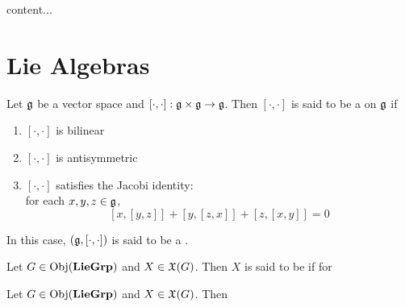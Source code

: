 \documentclass{book}
\begin{document}
\begin{defn}
	content...
\end{defn}






































\section{Lie Algebras}

\begin{defn}
	Let $\mathfrak{g}$ be a vector space and $[\cdot, \cdot]: \mathfrak{g} \times \mathfrak{g} \rightarrow \mathfrak{g}$. 
	Then $[\cdot, \cdot]$ is said to be a  on $\mathfrak{g}$ if  
	\begin{enumerate}
		\item $[\cdot, \cdot]$ is bilinear
		\item $[\cdot, \cdot]$ is antisymmetric
		\item $[\cdot, \cdot]$ satisfies the Jacobi identity: \\
		for each $x, y, z \in \mathfrak{g}$, 
		$$[x, [y,z]] + [y, [z,x]] + [z, [x,y]] = 0$$
	\end{enumerate}
	In this case, $(\mathfrak{g}, [\cdot, \cdot])$ is said to be a .
\end{defn}

\begin{defn}
	Let $G \in \operatorname{Obj}(\operatorname*{\text{\textbf{LieGrp}}})$ and $X \in \mathfrak{X}(G)$. Then $X$ is said to be  if for 
\end{defn}

\begin{ex}
	Let $G \in \operatorname{Obj}(\operatorname*{\text{\textbf{LieGrp}}})$ and $X \in \mathfrak{X}(G)$. Then  
\end{ex}
\end{document}
